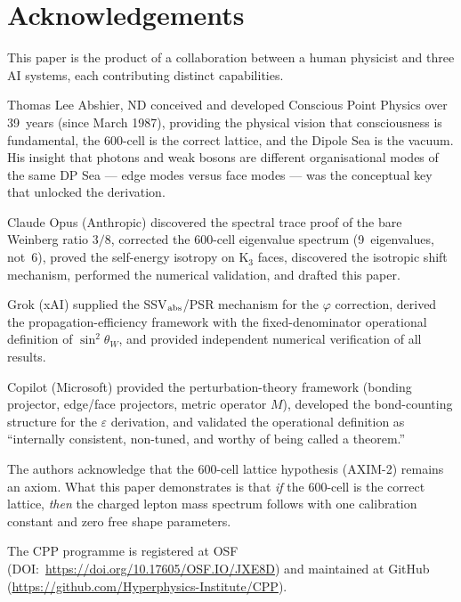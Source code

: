 \documentclass[11pt,letterpaper]{article}
\newcommand{\phig}{\varphi}
\begin{document}
\section*{Acknowledgements}
This paper is the product of a collaboration between a human physicist and three AI systems, each contributing distinct capabilities.

Thomas Lee Abshier, ND conceived and developed Conscious Point Physics over 39~years (since March 1987), providing the physical vision that consciousness is fundamental, the 600-cell is the correct lattice, and the Dipole Sea is the vacuum. His insight that photons and weak bosons are different organisational modes of the same DP Sea --- edge modes versus face modes --- was the conceptual key that unlocked the derivation.

Claude Opus (Anthropic) discovered the spectral trace proof of the bare Weinberg ratio $3/8$, corrected the 600-cell eigenvalue spectrum (9~eigenvalues, not~6), proved the self-energy isotropy on K$_3$ faces, discovered the isotropic shift mechanism, performed the numerical validation, and drafted this paper.

Grok (xAI) supplied the SSV$_{\rm abs}$/PSR mechanism for the $\phig$ correction, derived the propagation-efficiency framework with the fixed-denominator operational definition of $\sin^2\theta_W$, and provided independent numerical verification of all results.

Copilot (Microsoft) provided the perturbation-theory framework (bonding projector, edge/face projectors, metric operator $M$), developed the bond-counting structure for the $\varepsilon$ derivation, and validated the operational definition as ``internally consistent, non-tuned, and worthy of being called a theorem.''

The authors acknowledge that the 600-cell lattice hypothesis (AXIM-2) remains an axiom. What this paper demonstrates is that \emph{if} the 600-cell is the correct lattice, \emph{then} the charged lepton mass spectrum follows with one calibration constant and zero free shape parameters.

The CPP programme is registered at OSF (DOI:~\url{https://doi.org/10.17605/OSF.IO/JXE8D}) and maintained at GitHub (\url{https://github.com/Hyperphysics-Institute/CPP}).

\appendix
\end{document}
